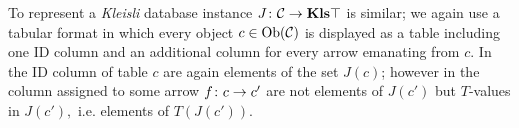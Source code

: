 \documentclass[../main/CT4S-EN-RU]{subfiles}
\begin{document}
\begin{blockRUS}
\end{blockRUS}

\begin{blockENG}
To represent a {\em Kleisli} database instance $J\colon\mathcal{C}\rightarrow{\mathbf{Kls}}{\top}$ is similar; we again use a tabular format in which every object $c\in\operatorname{Ob}(\mathcal{C})$ is displayed as a table including one ID column and an additional column for every arrow emanating from $c.$ In the ID column of table $c$ are again elements of the set $J(c)$; however in the column assigned to some arrow $f\colon c\rightarrow c'$ are not elements of $J(c')$ but $T$-values in $J(c'),$ i.e. elements of $T(J(c')).$ 
\end{blockENG}

\begin{blockRUS}
\end{blockRUS}
\end{document}
